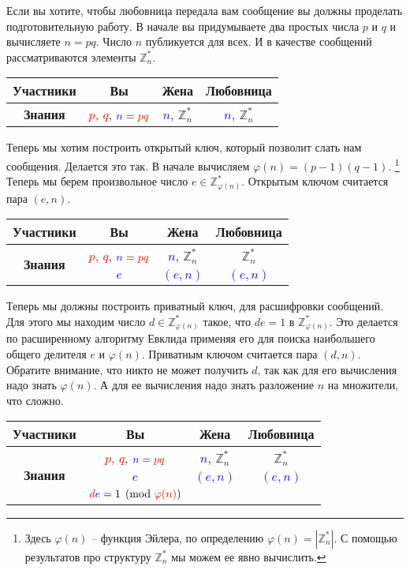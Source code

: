 Если вы хотите, чтобы любовница передала вам сообщение вы должны проделать подготовительную работу.
В начале вы придумываете два простых числа $p$ и $q$ и вычисляете $n = pq$.
Число $n$ публикуется для всех.
И в качестве сообщений рассматриваются элементы $\mathbb Z_n^*$.
\begin{center}
\begin{tabular}{|c|c|c|c|}
\hline
{\bf Участники}&{Вы}&{Жена}&{Любовница}\\
\hline
{\bf Знания}&{\textcolor{red}{$p$, $q$}, $\textcolor{blue}{n} = \textcolor{red}{pq}$}&{\textcolor{blue}{$n$}, $\mathbb Z_n^*$}&{\textcolor{blue}{$n$}, $\mathbb Z_n^*$}\\
\hline
\end{tabular}
\end{center}

Теперь мы хотим построить открытый ключ, который позволит слать нам сообщения.
Делается это так.
В начале вычисляем $\varphi(n) = (p-1)(q-1)$.%
\footnote{Здесь $\varphi(n)$ -- функция Эйлера, по определению $\varphi(n) = |\mathbb Z_n^*|$.
С помощью результатов про структуру $\mathbb Z_n^*$ мы можем ее явно вычислить.}
Теперь мы берем произвольное число $e\in \mathbb Z_{\varphi(n)}^*$.
Открытым ключом считается пара $(e, n)$.
\begin{center}
\begin{tabular}{|c|c|c|c|}
\hline
{\bf Участники}&{Вы}&{Жена}&{Любовница}\\
\hline
\multirow{2}{*}{\bf Знания}&{\textcolor{red}{$p$, $q$}, $\textcolor{blue}{n} = \textcolor{red}{pq}$}&{\textcolor{blue}{$n$}, $\mathbb Z_n^*$}&{$\mathbb Z_n^*$}\\
{}&{\textcolor{blue}{$e$}}&{\textcolor{blue}{$(e, n)$}}&{\textcolor{blue}{$(e, n)$}}\\
\hline
\end{tabular}
\end{center}

Теперь мы должны построить приватный ключ, для расшифровки сообщений.
Для этого мы находим число $d\in \mathbb Z_{\varphi(n)}^*$ такое, что $de = 1$ в $\mathbb Z_{\varphi(n)}^*$.
Это делается по расширенному алгоритму Евклида применяя его для поиска наибольшего общего делителя $e$ и $\varphi(n)$.
Приватным ключом считается пара $(d, n)$.
Обратите внимание, что никто не может получить $d$, так как для его вычисления надо знать $\varphi(n)$.
А для ее вычисления надо знать разложение $n$ на множители, что сложно.
\begin{center}
\begin{tabular}{|c|c|c|c|}
\hline
{\bf Участники}&{Вы}&{Жена}&{Любовница}\\
\hline
\multirow{3}{*}{\bf Знания}&{\textcolor{red}{$p$, $q$}, $\textcolor{blue}{n} = \textcolor{red}{pq}$}&{\textcolor{blue}{$n$}, $\mathbb Z_n^*$}&{$\mathbb Z_n^*$}\\
{}&{\textcolor{blue}{$e$}}&{\textcolor{blue}{$(e, n)$}}&{\textcolor{blue}{$(e, n)$}}\\
{}&{$\textcolor{red}{d}\textcolor{blue}{e} = 1 \pmod{ \textcolor{red}{\varphi(n)}}$}&{}&{}\\
\hline
\end{tabular}
\end{center}

